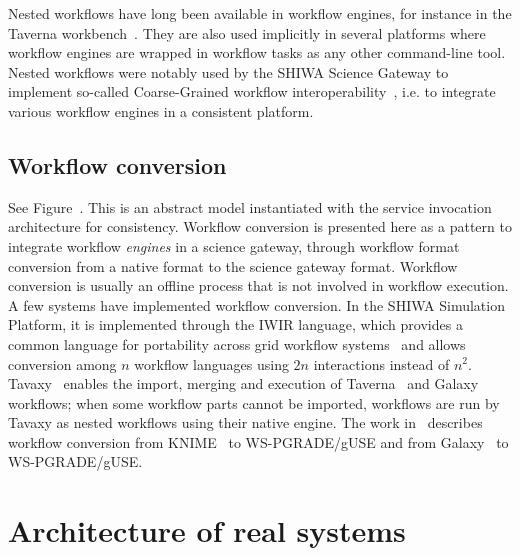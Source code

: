 \documentclass[preprint,3p,twocolumn]{elsarticle}
\newcommand{\todo}[2]{\pdfmargincomment[color=red,author=#1,open=true]{#2}}
\newcommand{\correction}[1]{\color{blue}#1\color{black}\xspace}
\begin{document}
Nested workflows have long been available in workflow engines, for
instance in the Taverna workbench~\cite{oinn2004taverna}. They are
also used implicitly in several platforms where workflow engines are
wrapped in workflow tasks as any other command-line tool. Nested
workflows were notably used by the SHIWA Science Gateway to implement
so-called Coarse-Grained workflow
interoperability~\cite{terstyanszky2014enabling}, i.e. to integrate
various workflow engines in a consistent
platform. 

\subsection{Workflow conversion}

See Figure~. This is an abstract model
instantiated with the service invocation architecture for
consistency. \correction{Workflow conversion is presented here as a pattern to
integrate workflow \emph{engines} in a science gateway, through
workflow format conversion from a native format to the science gateway
format.} Workflow conversion is usually an offline process that is not
involved in workflow execution. A few systems have implemented
workflow conversion. In the SHIWA Simulation Platform, it is
implemented through the IWIR language, which provides a common
language for portability across grid workflow
systems~\cite{plankensteiner-prodan-etal:2013} and allows conversion
among $n$ workflow languages using $2n$ interactions instead of $n^2$.
Tavaxy~\cite{Abouelhoda2012} enables the import, merging and execution
of Taverna~\cite{oinn2004taverna} and Galaxy~\cite{goecks2010galaxy}
workflows; when some workflow parts cannot be imported, workflows are
run by Tavaxy as nested workflows using their native engine. The work
in~\cite{delaGarza2016} describes workflow conversion from
KNIME~\cite{Berthold2008} to WS-PGRADE/gUSE and from
Galaxy~\cite{goecks2010galaxy} to WS-PGRADE/gUSE.


\correction{\section{Architecture of real systems}}

\label{sec:real systems}

\end{document}
